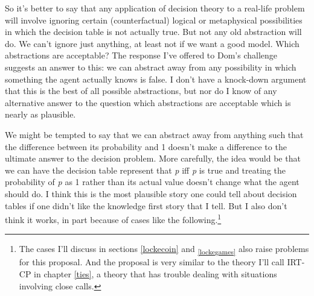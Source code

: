 \documentclass[
  11pt,
]{book}
\begin{document}
So it's better to say that any application of decision theory to a real-life problem will involve ignoring certain (counterfactual) logical or metaphysical possibilities in which the decision table is not actually true. But not any old abstraction will do. We can't ignore just anything, at least not if we want a good model. Which abstractions are acceptable? The response I've offered to Dom's challenge suggests an answer to this: we can abstract away from any possibility in which something the agent actually knows is false. I don't have a knock-down argument that this is the best of all possible abstractions, but nor do I know of any alternative answer to the question which abstractions are acceptable which is nearly as plausible.

We might be tempted to say that we can abstract away from anything such that the difference between its probability and 1 doesn't make a difference to the ultimate answer to the decision problem. More carefully, the idea would be that we can have the decision table represent that \emph{p} iff \emph{p} is true and treating the probability of \emph{p} as 1 rather than its actual value doesn't change what the agent should do. I think this is the most plausible story one could tell about decision tables if one didn't like the knowledge first story that I tell. But I also don't think it works, in part because of cases like the following.\footnote{The cases I'll discuss in sections \ref{lockecoin} and \textsubscript{\ref{lockegames}} also raise problems for this proposal. And the proposal is very similar to the theory I'll call IRT-CP in chapter \ref{ties}, a theory that has trouble dealing with situations involving close calls.}
\end{document}
